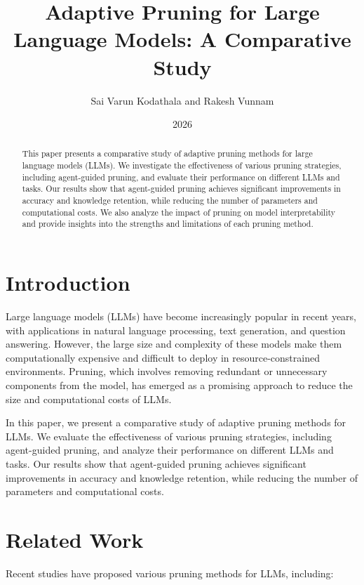 \documentclass{article}
\begin{document}
\title{Adaptive Pruning for Large Language Models: A Comparative Study}
\author{Sai Varun Kodathala and Rakesh Vunnam}
\date{2026}

\maketitle

\begin{abstract}
This paper presents a comparative study of adaptive pruning methods for large language models (LLMs). We investigate the effectiveness of various pruning strategies, including agent-guided pruning, and evaluate their performance on different LLMs and tasks. Our results show that agent-guided pruning achieves significant improvements in accuracy and knowledge retention, while reducing the number of parameters and computational costs. We also analyze the impact of pruning on model interpretability and provide insights into the strengths and limitations of each pruning method.
\end{abstract}

\section{Introduction}

Large language models (LLMs) have become increasingly popular in recent years, with applications in natural language processing, text generation, and question answering. However, the large size and complexity of these models make them computationally expensive and difficult to deploy in resource-constrained environments. Pruning, which involves removing redundant or unnecessary components from the model, has emerged as a promising approach to reduce the size and computational costs of LLMs.

In this paper, we present a comparative study of adaptive pruning methods for LLMs. We evaluate the effectiveness of various pruning strategies, including agent-guided pruning, and analyze their performance on different LLMs and tasks. Our results show that agent-guided pruning achieves significant improvements in accuracy and knowledge retention, while reducing the number of parameters and computational costs.

\section{Related Work}

Recent studies have proposed various pruning methods for LLMs, including:
\end{document}
